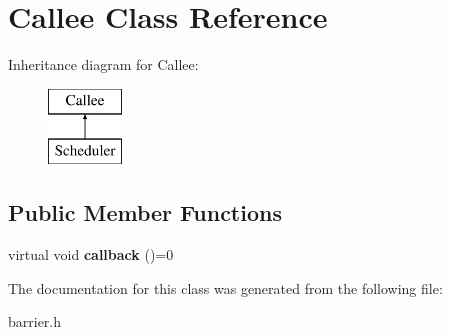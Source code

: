 \hypertarget{classCallee}{\section{Callee Class Reference}
\label{classCallee}
}
Inheritance diagram for Callee\-:\begin{figure}[H]
\begin{center}
\leavevmode
\includegraphics[height=2.000000cm]{classCallee}
\end{center}
\end{figure}
\subsection*{Public Member Functions}
\begin{DoxyCompactItemize}
\item 
\hypertarget{classCallee_a9224b75c8810dcdd2b8eefec4767d151}{virtual void {\bfseries callback} ()=0}\label{classCallee_a9224b75c8810dcdd2b8eefec4767d151}

\end{DoxyCompactItemize}


The documentation for this class was generated from the following file\-:\begin{DoxyCompactItemize}
\item 
barrier.\-h\end{DoxyCompactItemize}
